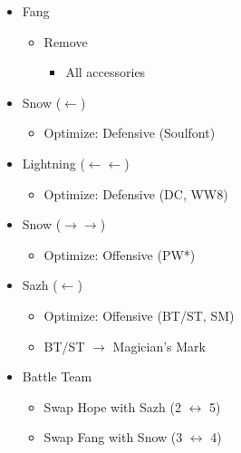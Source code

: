 \begin{paracol}{2}
\begin{menu}
\begin{itemize}
\begin{itemize}
\begin{itemize}
\begin{itemize}
					            \end{itemize}
				      \end{itemize}
			\end{itemize}
			\equip
			\begin{itemize}
				\item Fang
				      \begin{itemize}
					      \item Remove
					            \begin{itemize}
						            \item All accessories
					            \end{itemize}
				      \end{itemize}
				\item Snow ($\leftarrow$)
				      \begin{itemize}
					      \item Optimize: Defensive (Soulfont)
				      \end{itemize}
				\item Lightning ($\leftarrow\leftarrow$)
				      \begin{itemize}
					      \item Optimize: Defensive (DC, WW8)
				      \end{itemize}
				\item Snow ($\rightarrow\rightarrow$)
				      \begin{itemize}
					      \item Optimize: Offensive (PW*)
				      \end{itemize}
				\item Sazh ($\leftarrow$)
				      \begin{itemize}
					      \item Optimize: Offensive (BT/ST, SM)
					      \item BT/ST $\rightarrow$ Magician's Mark
				      \end{itemize}
			\end{itemize}
		\end{itemize}
	\end{menu}
	\switchcolumn
	\begin{menu}
		\begin{itemize}
			\paradigm
			\begin{itemize}
				\item Battle Team
				      \begin{itemize}
					      \item Swap Hope with Sazh (2 $\leftrightarrow$ 5)
					      \item Swap Fang with Snow (3 $\leftrightarrow$ 4)

\end{itemize}
\end{itemize}
\end{itemize}
\end{menu}
\end{paracol}
